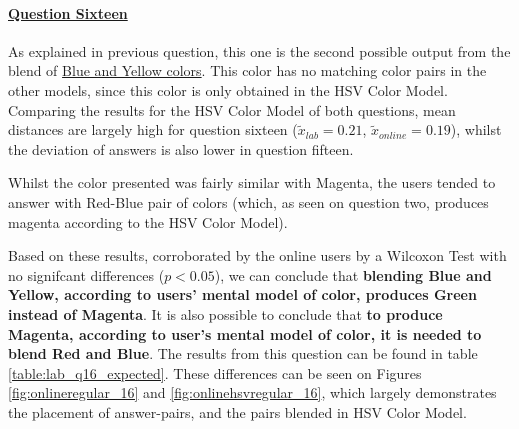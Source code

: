 \paragraph{\ul{Question Sixteen}}
%
As explained in previous question, this one is the second possible output from the blend of \ul{Blue and Yellow colors}. This color has no matching color pairs in the other models,
since this color is only obtained in the HSV Color Model. Comparing the results for the HSV Color Model of both questions, mean distances are largely high for question sixteen
($\tilde{x}_{lab} = 0.21$, $\tilde{x}_{online} = 0.19$), whilst the deviation of answers is also lower in question fifteen. \par
%
Whilst the color presented was fairly similar with Magenta, the users tended to answer with Red-Blue pair of colors (which, as seen on question two, produces magenta according
to the HSV Color Model). \par
%
Based on these results, corroborated by the online users by a Wilcoxon Test with no signifcant differences ($p < 0.05$), we can conclude that \textbf{blending Blue and Yellow, according to users' mental model of color, produces Green instead of Magenta}. It is also
possible to conclude that \textbf{to produce Magenta, according to user's mental model of color, it is needed to blend Red and Blue}. The results from
this question can be found in table \ref{table:lab_q16_expected}. These differences can be seen on Figures \ref{fig:onlineregular_16} and \ref{fig:onlinehsvregular_16}, which largely
demonstrates the placement of answer-pairs, and the pairs blended in HSV Color Model.
%
